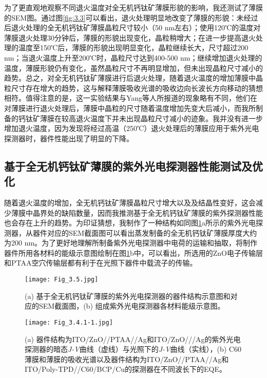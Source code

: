 \documentclass[forlib]{WHUMaster}   %
\begin{document}
{为了更直观地观察不同退火温度对全无机钙钛矿薄膜形貌的影响，我还测试了薄膜的SEM图。通过图\ref{fig:3.3}可以看出，退火处理明显地改变了薄膜的形貌：未经过后退火处理的全无机钙钛矿薄膜晶粒尺寸较小（50 nm左右）；使用120℃的温度对薄膜退火处理30分钟后，薄膜的形貌出现变化，晶粒稍增大；在进一步提高退火处理的温度至150℃后，薄膜的形貌出现明显变化，晶粒继续长大，尺寸超过200 nm；当退火温度上升至200℃时，晶粒尺寸达到400-500 nm；继续增加退火处理的温度，薄膜形貌仍有变化，虽然晶粒尺寸不再明显增加，但未出现晶粒尺寸减小的趋势。总之，对全无机钙钛矿薄膜进行后退火处理，随着退火温度的增加薄膜中晶粒尺寸存在增大的趋势，这与解释薄膜吸收光谱的吸收边向长波长方向移动的猜想相符。值得注意的是，这一实验结果与Yang等人\cite{RN90}所报道的现象略有不同，他们在对薄膜进行退火处理后，薄膜中晶粒的尺寸随着温度增加先变大后减小，而我所制备的钙钛矿薄膜在较高退火温度下并未出现晶粒尺寸减小的迹象。我并没有进一步增加退火温度，因为发现将经过高温（250℃）退火处理后的薄膜应用于紫外光电探测器时，器件性能出现了明显的下降。

\subsection[基于{\ce{CsPbCl3}}的紫外光电探测器性能测试及优化]{\texorpdfstring{基于{}全无机钙钛矿薄膜的紫外光电探测器性能测试及优化}{PDFstring}}

随着退火温度的增加，全无机钙钛矿薄膜晶粒尺寸增大以及及结晶性变好，这会减少薄膜中晶界处的缺陷数量，因而我推测基于全无机钙钛矿薄膜的紫外探测器性能也会存在上升的趋势。为印证猜想，我制作了一种结构如同图\ref{fig:3.4}a所示的紫外光电探测器，从器件对应的SEM截面图可以看出蒸发制备的全无机钙钛矿薄膜厚度大约为200 nm。为了更好地理解所制备紫外光电探测器中电荷的运输和抽取，将制作器件所用各材料的能级示意图绘制在图\ref{fig:3.4}b中，可以看出，所选用的ZnO电子传输层和PTAA空穴传输层都有利于在光照下器件中载流子的传输。

\begin{figure}[ht]
\centering
  \texttt{[image: Fig\_3.5.jpg]}
  \caption{\rm  (a) 基于全无机钙钛矿薄膜的紫外光电探测器的器件结构示意图和对应的SEM截面图，(b) 组成紫外光电探测器各材料能级示意图。}
  \label{fig:3.4}
\end{figure}

\begin{figure}[ht]
\centering
  \texttt{[image: Fig\_3.4.1-1.jpg]} %
  \caption{\rm (a) 器件结构为ITO/ZnO//PTAA//Ag和ITO/ZnO///Ag的紫外光电探测器的暗态\emph{J-V}曲线（虚线）与光照下的\emph{J-V}曲线（实线），(b) C60薄膜和薄膜的吸收光谱以及器件结构为ITO/ZnO//PTAA//Ag和ITO/Poly-TPD//C60/BCP/Cu的探测器在不同波长下的EQE。}
  \label{fig:3.4.1}
\end{figure}

}
\end{document}
